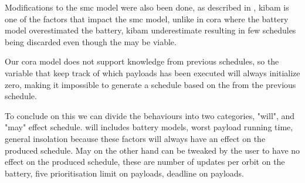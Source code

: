 Modifications to the \gls{smc} model were also been done, as described in , \gls{kibam} is one of the factors that impact the \gls{smc} model, unlike in \gls{cora} where the battery model overestimated the battery, \gls{kibam} underestimate resulting in few schedules being discarded even though the may be viable.

Our \gls{cora} model does not support knowledge from previous schedules, so the variable  that keep track of which payloads has been executed will always initialize zero, making it impossible to generate a schedule based on the  from the previous schedule.

To conclude on this we can divide the behaviours into two categories, "will", and "may" effect schedule. will includes battery models, worst payload running time, general insolation because these factors will always have an effect on the produced schedule. May on the other hand can be tweaked by the user to have no effect on the produced schedule, these are number of updates per orbit on the battery, five prioritisation limit on payloads, deadline on payloads.



 







